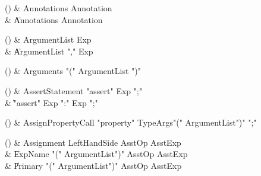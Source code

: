 \begin{bbgrammarappendix}

() & Annotations \label{prod:Annotations}  \: Annotation  \\

 &    \| Annotations Annotation \\

\end{bbgrammarappendix}

\begin{bbgrammarappendix}

() & ArgumentList \label{prod:ArgumentList}  \: Exp  \\

 &    \| ArgumentList \xcd"," Exp \\

\end{bbgrammarappendix}

\begin{bbgrammarappendix}

() & Arguments \label{prod:Arguments}  \: \xcd"(" ArgumentList \xcd")"  \\


\end{bbgrammarappendix}

\begin{bbgrammarappendix}

() & AssertStatement \label{prod:AssertStatement}  \: \xcd"assert" Exp \xcd";"  \\

 &    \| \xcd"assert" Exp  \xcd":" Exp  \xcd";" \\

\end{bbgrammarappendix}

\begin{bbgrammarappendix}

() & AssignPropertyCall \label{prod:AssignPropertyCall}  \: \xcd"property" TypeArgs\opt \xcd"(" ArgumentList\opt \xcd")" \xcd";"  \\


\end{bbgrammarappendix}

\begin{bbgrammarappendix}

() & Assignment \label{prod:Assignment}  \: LeftHandSide AsstOp AsstExp  \\

 &    \| ExpName  \xcd"(" ArgumentList\opt \xcd")" AsstOp AsstExp \\
 &    \| Primary  \xcd"(" ArgumentList\opt \xcd")" AsstOp AsstExp \\

\end{bbgrammarappendix}

